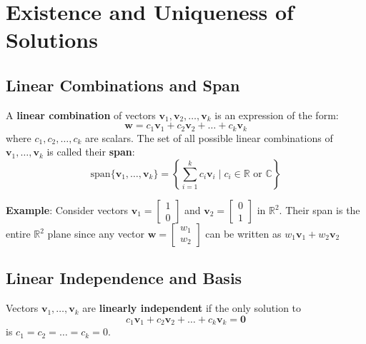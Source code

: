 \section{Existence and Uniqueness of Solutions}

\subsection{Linear Combinations and Span} %
A \textbf{linear combination} of vectors $ \mathbf{v}_1, \mathbf{v}_2, \ldots, \mathbf{v}_k $ is an expression of the form:
\begin{equation*}
    \mathbf{w} = c_1 \mathbf{v}_1 + c_2 \mathbf{v}_2 + \ldots + c_k \mathbf{v}_k
\end{equation*}
where $ c_1, c_2, \ldots, c_k $ are scalars. The set of all possible linear combinations of $ \mathbf{v}_1, \ldots, \mathbf{v}_k $ is called their \textbf{span}:
\begin{equation*}
    \text{span}\{\mathbf{v}_1, \ldots, \mathbf{v}_k\} = \left\{ \sum_{i=1}^k c_i \mathbf{v}_i \mid c_i \in \mathbb{R} \text{ or } \mathbb{C} \right\}
\end{equation*}

\begin{exampleBox}
    \textbf{Example}: Consider vectors $ \mathbf{v}_1 = \begin{bmatrix}1 \\ 0\end{bmatrix} $ and $ \mathbf{v}_2 = \begin{bmatrix}0 \\ 1\end{bmatrix} $ in $ \mathbb{R}^2 $. Their span is the entire $ \mathbb{R}^2 $ plane since any vector $ \mathbf{w} = \begin{bmatrix}w_1 \\ w_2\end{bmatrix} $ can be written as $ w_1 \mathbf{v}_1 + w_2 \mathbf{v}_2 $
\end{exampleBox}

\subsection{Linear Independence and Basis}
Vectors $ \mathbf{v}_1, \ldots, \mathbf{v}_k $ are \textbf{linearly independent} if the only solution to
\begin{equation*}
    c_1 \mathbf{v}_1 + c_2 \mathbf{v}_2 + \ldots + c_k \mathbf{v}_k = \mathbf{0}
\end{equation*}
is $ c_1 = c_2 = \ldots = c_k = 0 $.

